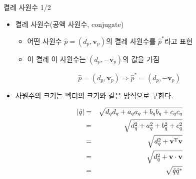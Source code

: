 \begin{frame}[fragile]{켤레 사원수 1/2}

\begin{itemize}
\item 켤레 사원수(공액 사원수, conjugate)
	\begin{itemize}
	\item 어떤 사원수 $\hat p = (d_p, \mathbf v_p)$의 켤레 사원수를 $\hat p^*$라고 표현
	\item 이 켤레 이 사원수는 $(d_p, - \mathbf v_p)$의 값을 가짐
	\end{itemize}
\end{itemize}

$$\hat p = (d_p ,  \mathbf v_p) \Rightarrow \hat p^* = (d_p , -\mathbf v_p)$$

\begin{itemize}
\item 사원수의 크기는 벡터의 크기와 같은 방식으로 구한다.
\end{itemize}

\begin{eqnarray} \nonumber
|\hat q| & = &\sqrt{d_q  d_q + a_q a_q + b_q b_q + c_q c_q} \\ \nonumber
& = & \sqrt{d_q^2 + a_q^2 + b_q^2 + c_q^2} \\ \nonumber
& = & \sqrt{d_q^2 + \mathbf v^{\rm T} \mathbf v} \\ \nonumber
& = & \sqrt{d_q^2 + \mathbf v \cdot \mathbf v} \\ \nonumber
& = & \sqrt{\hat q \hat q^*} \nonumber
\end{eqnarray}



\end{frame}

